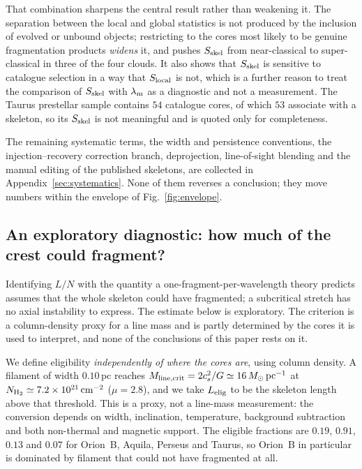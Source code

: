 \documentclass[usenatbib,twoside,twocolumn]{mnras}
\begin{document}
That combination sharpens the central result rather than weakening it. The separation between the local and global statistics is not produced by the inclusion of evolved or unbound objects; restricting to the cores most likely to be genuine fragmentation products \emph{widens} it, and pushes $S_{\rm skel}$ from near-classical to super-classical in three of the four clouds. It also shows that $S_{\rm skel}$ is sensitive to catalogue selection in a way that $S_{\rm local}$ is not, which is a further reason to treat the comparison of $S_{\rm skel}$ with $\lambda_{\rm m}$ as a diagnostic and not a measurement. The Taurus prestellar sample contains $54$ catalogue cores, of which $53$ associate with a skeleton, so its $S_{\rm skel}$ is not meaningful and is quoted only for completeness.




The remaining systematic terms, the width and persistence conventions, the injection--recovery correction branch, deprojection, line-of-sight blending and the manual editing of the published skeletons, are collected in Appendix~\ref{sec:systematics}. None of them reverses a conclusion; they move numbers within the envelope of Fig.~\ref{fig:envelope}.

\subsection{An exploratory diagnostic: how much of the crest could fragment?}
\label{sec:eligible}


Identifying $L/N$ with the quantity a one-fragment-per-wavelength theory predicts assumes that the whole skeleton could have fragmented; a subcritical stretch has no axial instability to express. The estimate below is exploratory. The criterion is a column-density proxy for a line mass and is partly determined by the cores it is used to interpret, and none of the conclusions of this paper rests on it.

We define eligibility \emph{independently of where the cores are}, using column density. A filament of width $0.10$\,pc reaches $M_{\rm line,crit}=2c_s^2/G\simeq16\,M_\odot\,{\rm pc^{-1}}$ at $N_{\rm H_2}\simeq7.2\times10^{21}\,{\rm cm^{-2}}$ ($\mu=2.8$), and we take $L_{\rm elig}$ to be the skeleton length above that threshold. This is a proxy, not a line-mass measurement: the conversion depends on width, inclination, temperature, background subtraction and both non-thermal and magnetic support. The eligible fractions are $0.19$, $0.91$, $0.13$ and $0.07$ for Orion~B, Aquila, Perseus and Taurus, so Orion~B in particular is dominated by filament that could not have fragmented at all.
\end{document}

